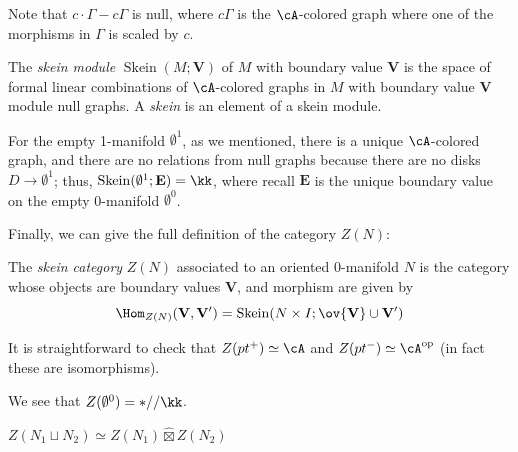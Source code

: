 \documentclass[12pt]{article}
\newcommand{\empt}[1]{{\emptyset^{#1}}}
\newcommand{\VV}{{\mathbf{V}}}
\newcommand{\EE}{{\mathbf{E}}}
\DeclareMathOperator{\Skein}{Skein}
\newcommand{\op}{{\text{op}}}
\newcommand{\hatbox}{{\hat{\boxtimes}}}
\begin{document}
Note that $c \cdot \Gamma - c\Gamma$ is null,
where $c\Gamma$ is the $\cA$-colored graph
where one of the morphisms in $\Gamma$ is scaled by $c$.

\begin{definition}
\label{d:skein}
The \emph{skein module} $\Skein(M;\VV)$
of $M$ with boundary value $\VV$
is the space of formal linear combinations of
$\cA$-colored graphs in $M$ with boundary value $\VV$
module null graphs.
A \emph{skein} is an element of a skein module.
\end{definition}


For the empty 1-manifold $\empt{1}$,
as we mentioned, there is a unique $\cA$-colored graph,
and there are no relations from null graphs
because there are no disks $D \to \empt{1}$;
thus, $\Skein(\empt{1};\EE) = \kk$,
where recall $\EE$ is the unique boundary value on
the empty 0-manifold $\empt{0}$.


Finally, we can give the full definition of the category
$Z(N)$:

\begin{definition}
\label{d:skein-category}
The \emph{skein category} $Z(N)$ associated to an
oriented 0-manifold $N$
is the category whose objects are boundary values $\VV$,
and morphism are given by
\[
\Hom_{Z(N)}(\VV,\VV') = \Skein(N \times I; \ov{\VV} \cup \VV')
\]
\end{definition}

It is straightforward to check that
$Z(pt^+) \simeq \cA$
and $Z(pt^-) \simeq \cA^\op$
(in fact these are isomorphisms).

We see that $Z(\empt{0}) = *//\kk$.



\begin{proposition}
$Z(N_1 \sqcup N_2) \simeq Z(N_1) \hatbox Z(N_2)$
\end{proposition}
\end{document}
